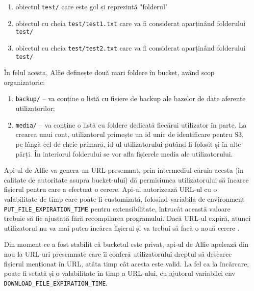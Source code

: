 \begin{enumerate}
    \item obiectul \texttt{test/} care este gol și reprezintă "folderul"
    \item obiectul cu cheia \texttt{test/test1.txt} care va fi considerat aparținând folderului \texttt{test/}
    \item obiectul cu cheia \texttt{test/test2.txt} care va fi considerat aparținând folderului \texttt{test/}
\end{enumerate}

În felul acesta, Alfie definește două mari foldere în bucket, având scop organizatoric:
\begin{enumerate}
    \item \texttt{backup/} – va conține o listă cu fișiere de backup ale bazelor de date aferente utilizatorilor;
    \item \texttt{media/} – va conține o listă cu foldere dedicată fiecărui utilizator în parte. La crearea unui cont, utilizatorul primește un id unic de identificare pentru S3, pe lângă cel de cheie primară, id-ul utilizatorului putând fi folosit și în alte părți. În interiorul folderului se vor afla fișierele media ale utilizatorului.
\end{enumerate}

Api-ul de Alfie va genera un URL presemnat, prin intermediul căruia acesta (în calitate de autoritate asupra bucket-ului) dă permisiunea utilizatorului să încarce fișierul pentru care a efectuat o cerere. Api-ul autorizează URL-ul cu o valabilitate de timp care poate fi customizată, folosind variabila de environment \texttt{PUT_FILE_EXPIRATION_TIME} pentru extensibilitate, întrucât această valoare trebuie să fie ajustată fără recompilarea programului. Dacă URL-ul expiră, atunci utilizatorul nu va mai putea încărca fișierul și va trebui să facă o nouă cerere \cite{s3PresignedUploadURL}.

Din moment ce a fost stabilit că bucketul este privat, api-ul de Alfie apelează din nou la URL-uri presemnate care îi conferă utilizatorului dreptul să descarce fișierul menționat în URL, atâta timp cât acesta este valid. La fel ca la încărcare, poate fi setată și o valabilitate în timp a URL-ului, cu ajutorul variabilei env \texttt{DOWNLOAD_FILE_EXPIRATION_TIME}.

